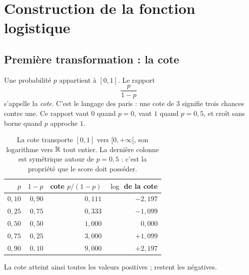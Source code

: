 \chapter{Construction de la fonction logistique}
\label{ann:logit}


\section{Première transformation : la cote}

Une probabilité $p$ appartient à $[0,1]$. Le rapport
\[
  \frac{p}{1-p}
\]
s'appelle la \emph{cote}. C'est le langage des paris : une cote de $3$ signifie
trois chances contre une. Ce rapport vaut $0$ quand $p=0$, vaut $1$ quand
$p=0{,}5$, et croît sans borne quand $p$ approche $1$.

\begin{table}[htbp]
\centering
\begin{tabular}{rrrr}
\toprule
$p$ & $1-p$ & cote $p/(1-p)$ & $\log$ de la cote \\
\midrule
$0{,}10$ & $0{,}90$ & $0{,}111$ & $-2{,}197$ \\
$0{,}25$ & $0{,}75$ & $0{,}333$ & $-1{,}099$ \\
$0{,}50$ & $0{,}50$ & $1{,}000$ & $0{,}000$ \\
$0{,}75$ & $0{,}25$ & $3{,}000$ & $+1{,}099$ \\
$0{,}90$ & $0{,}10$ & $9{,}000$ & $+2{,}197$ \\
\bottomrule
\end{tabular}
\caption{La cote transporte $[0,1]$ vers $[0,+\infty[$, son logarithme vers
$\mathbb{R}$ tout entier. La dernière colonne est symétrique autour de $p=0{,}5$ : c'est
la propriété que le score doit posséder.}
\label{tab:cotes}
\end{table}

La cote atteint ainsi toutes les valeurs positives ; restent les négatives.

